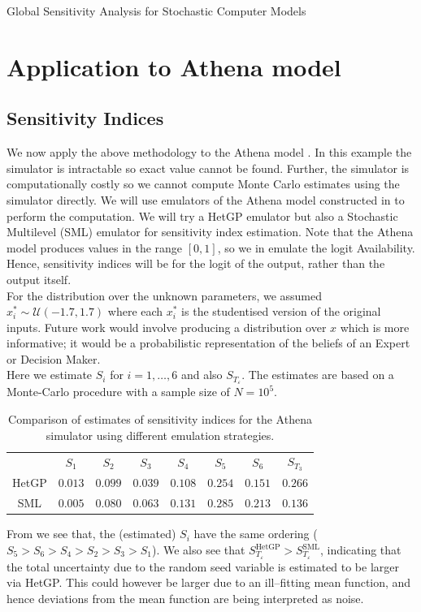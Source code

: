 \begin{chapter}{Global Sensitivity Analysis for Stochastic Computer Models}
\section{Application to Athena model}
\subsection{Sensitivity Indices}
We now apply the above methodology to the Athena model \citep{Zit13, Zit16}. In this example the simulator is intractable so exact value cannot be found. Further, the simulator is computationally costly so we cannot compute Monte Carlo estimates using the simulator directly. We will use emulators of the Athena model constructed in \label{Ch:Hetsml} to perform the computation. We will try a HetGP emulator but also a Stochastic Multilevel (SML) emulator for sensitivity index estimation. Note that the Athena model produces values in the range $[0,1]$, so we in emulate the logit Availability. Hence, sensitivity indices will be for the logit of the output, rather than the output itself.\\

For the distribution over the unknown parameters, we assumed $x_i^* \sim \mathcal{U}(-1.7, 1.7)$ where each $x_i^*$ is the studentised version of the original inputs. Future work would involve producing a distribution over $x$ which is more informative; it would be a probabilistic representation of the beliefs of an Expert or Decision Maker.\\

Here we estimate $S_i$ for $i = 1,\ldots,6$ and also $S_{T_\varepsilon}$. The estimates are based on a Monte-Carlo procedure with a sample size of $N = 10^5$.

\begin{table}[h]
	\centering
	\begin{tabular}{cccccccc}
	\toprule
	& $S_1$ & $S_2$ & $S_3$ & $S_4$ &$S_5$ &$S_6$ &$S_{T_3}$ \\ \cmidrule{1-8}
	HetGP& $0.013$ & $0.099$ & $0.039$ & $0.108$ & $0.254$ & $0.151$ & $0.266$ \\
	SML& $0.005$ & $0.080$ & $0.063$ & $0.131$ & $0.285$ & $0.213$  & $0.136$\\ \bottomrule
	\end{tabular}
	\caption{Comparison of estimates of sensitivity indices for the Athena simulator using different emulation strategies.}
	\label{Tab:athena-si1}
\end{table}

From  we see that, the (estimated) $S_i$ have the same ordering ($S_5 > S_6 > S_4 > S_2 > S_3 > S_1$). We also see that $S_{T_\varepsilon}^{\text{HetGP}} > S_{T_\varepsilon}^{\text{SML}}$, indicating that the total uncertainty due to the random seed variable is estimated to be larger via HetGP. This could however be larger due to an ill--fitting mean function, and hence deviations from the mean function are being interpreted as noise. \\


\end{chapter}
